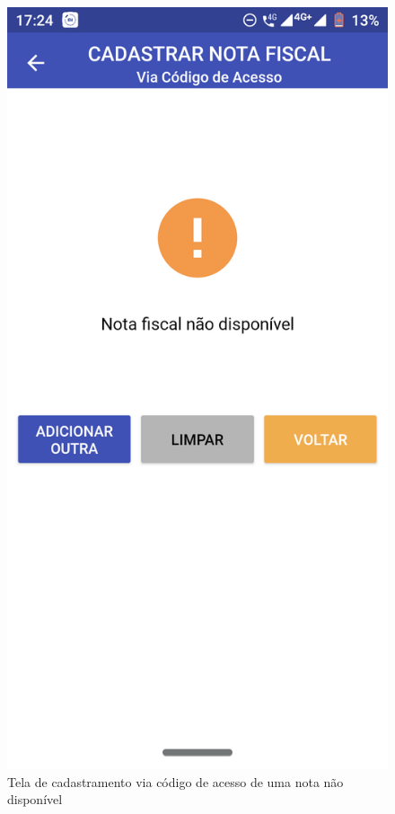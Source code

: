 \newpage
\begin{figure}[h]
    \centering
    \includegraphics[scale=0.15]{tcc/figures/app/app_codigo_acesso_nao_disponivel.png}
    \caption{Tela de cadastramento via código de acesso de uma nota não disponível}
    \label{appCodigoAcessoNaoDisponivelFig}
\end{figure}

